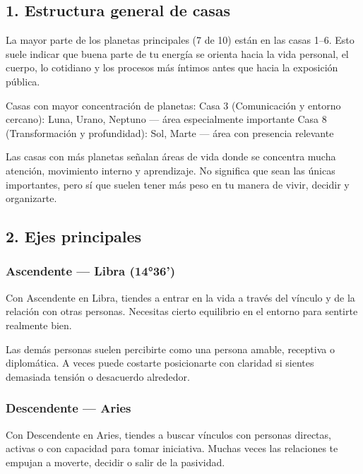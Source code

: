 \documentclass[11pt,a4paper]{article}
\begin{document}
\subsection{1. Estructura general de casas}

La mayor parte de los planetas principales (7 de 10) están en las casas 1–6. Esto suele indicar que buena parte de tu energía se orienta hacia la vida personal, el cuerpo, lo cotidiano y los procesos más íntimos antes que hacia la exposición pública.

Casas con mayor concentración de planetas:
Casa 3 (Comunicación y entorno cercano): Luna, Urano, Neptuno — área especialmente importante
Casa 8 (Transformación y profundidad): Sol, Marte — área con presencia relevante

Las casas con más planetas señalan áreas de vida donde se concentra mucha atención, movimiento interno y aprendizaje. No significa que sean las únicas importantes, pero sí que suelen tener más peso en tu manera de vivir, decidir y organizarte.

\vspace{0.5cm}

\subsection{2. Ejes principales}

\subsubsection*{Ascendente — Libra (14°36')}
Con Ascendente en Libra, tiendes a entrar en la vida a través del vínculo y de la relación con otras personas. Necesitas cierto equilibrio en el entorno para sentirte realmente bien.

Las demás personas suelen percibirte como una persona amable, receptiva o diplomática. A veces puede costarte posicionarte con claridad si sientes demasiada tensión o desacuerdo alrededor.

\subsubsection*{Descendente — Aries}
Con Descendente en Aries, tiendes a buscar vínculos con personas directas, activas o con capacidad para tomar iniciativa. Muchas veces las relaciones te empujan a moverte, decidir o salir de la pasividad.
\end{document}
